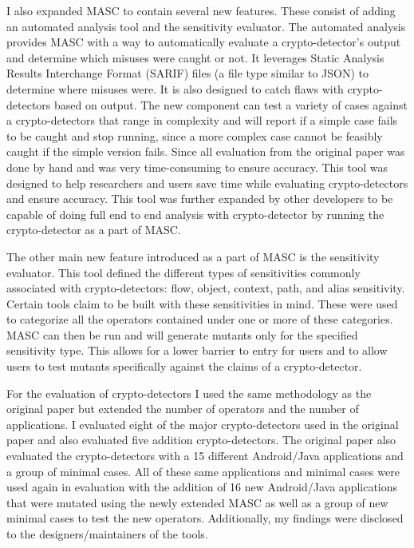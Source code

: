 I also expanded MASC to contain several new features. These consist of adding an automated analysis tool and the sensitivity evaluator. The automated analysis provides MASC with a way to automatically evaluate a crypto-detector's output and determine which misuses were caught or not. It leverages Static Analysis Results Interchange Format (SARIF) files (a file type similar to JSON) to determine where misuses were. It is also designed to catch flaws with crypto-detectors based on output. The new component can test a variety of cases against a crypto-detectors that range in complexity and will report if a simple case fails to be caught and stop running, since a more complex case cannot be feasibly caught if the simple version fails. Since all evaluation from the original paper was done by hand and was very time-consuming to ensure accuracy. This tool was designed to help researchers and users save time while evaluating crypto-detectors and ensure accuracy. This tool was further expanded by other developers to be capable of doing full end to end analysis with crypto-detector by running the crypto-detector as a part of MASC.

The other main new feature introduced as a part of MASC is the sensitivity evaluator. This tool defined the different types of sensitivities commonly associated with crypto-detectors: flow, object, context, path, and alias sensitivity. Certain tools claim to be built with these sensitivities in mind. These were used to categorize all the operators contained under one or more of these categories. MASC can then be run and will generate mutants only for the specified sensitivity type. This allows for a lower barrier to entry for users and to allow users to test mutants specifically against the claims of a crypto-detector. 

For the evaluation of crypto-detectors I used the same methodology as the original paper but extended the number of operators and the number of applications. I evaluated eight of the major crypto-detectors used in the original paper and also evaluated five addition crypto-detectors. The original paper also evaluated the crypto-detectors with a 15 different Android/Java applications and a group of minimal cases. All of these same applications and minimal cases were used again in evaluation with the addition of 16 new Android/Java applications that were mutated using the newly extended MASC as well as a group of new minimal cases to test the new operators. Additionally, my findings were disclosed to the designers/maintainers of the tools. 


